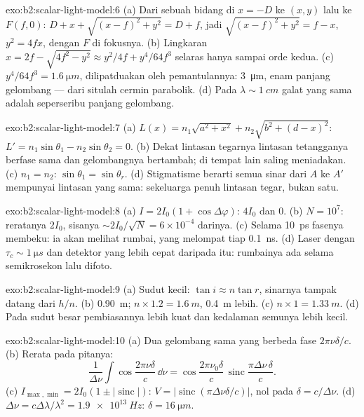 \begin{solution}{exo:b2:scalar-light-model:6}
(a) Dari sebuah  bidang di $x = -D$ ke $(x, y)$ lalu ke $F(f, 0)$: $D + x
+ \sqrt{(x - f)^2 + y^2} = D + f$, jadi $\sqrt{(x - f)^2 + y^2} = f - x$, $y^2 = 4fx$,
dengan $F$ di fokusnya. (b) Lingkaran $x = 2f - \sqrt{4f^2 - y^2} \approx y^2/4f +
y^4/64f^3$ selaras hanya sampai orde kedua. (c) $y^4/64f^3 = \qty{1.6}{\micro m}$, dilipatduakan
oleh pemantulannya: \qty{3}{\micro m}, enam panjang gelombang --- dari situlah cermin
parabolik. (d) Pada $\lambda \sim \qty{1}{cm}$ galat yang sama adalah seperseribu
panjang gelombang.
\end{solution}

\begin{solution}{exo:b2:scalar-light-model:7}
(a) $L(x) = n_1\sqrt{a^2 + x^2} + n_2\sqrt{b^2 + (d - x)^2}$: $L' = n_1\sin\theta_1 -
n_2\sin\theta_2 = 0$. (b) Dekat lintasan tegarnya lintasan tetangganya berfase
sama dan gelombangnya bertambah; di tempat lain saling meniadakan. (c) $n_1 = n_2$:
$\sin\theta_1 = \sin\theta_r$. (d) Stigmatisme berarti semua sinar dari $A$ ke $A'$ mempunyai
lintasan yang sama: sekeluarga penuh lintasan tegar, bukan satu.
\end{solution}

\begin{solution}{exo:b2:scalar-light-model:8}
(a) $I = 2I_0(1 + \cos\Delta\varphi)$: $4I_0$ dan $0$. (b) $N = 10^7$: reratanya $2I_0$, sisanya
$\sim 2I_0/\sqrt N = 6 \times 10^{-4}$ darinya. (c) Selama \qty{10}{ps} fasenya
membeku: ia akan melihat rumbai, yang melompat tiap \qty{0.1}{ns}. (d) Laser dengan
$\tau_c \sim \qty{1}{\micro s}$ dan detektor yang lebih cepat daripada itu: rumbainya ada
selama semikrosekon lalu difoto.
\end{solution}

\begin{solution}{exo:b2:scalar-light-model:9}
(a) Sudut kecil: $\tan i \approx n\tan r$, sinarnya tampak datang dari $h/n$.
(b) \qty{0.90}{m};  $n \times 1.2 = \qty{1.6}{m}$, \qty{0.4}{m} lebih.
(c) $n \times 1 = \qty{1.33}{m}$. (d) Pada sudut besar pembiasannya lebih kuat
dan kedalaman semunya lebih kecil.
\end{solution}

\begin{solution}{exo:b2:scalar-light-model:10}
(a) Dua gelombang sama yang berbeda fase $2\pi\nu\delta/c$. (b) Rerata
pada pitanya:
\[
\frac1{\Delta\nu}\int\cos\frac{2\pi\nu\delta}c\,\dd\nu = \cos\frac{2\pi\nu_0\delta}c\,\operatorname{sinc}\frac{\pi\Delta\nu\,\delta}c .
\]
(c)
$I_{\max, \min} = 2I_0(1 \pm |\operatorname{sinc}|)$: $V = |\operatorname{sinc}(\pi\Delta\nu\delta/c)|$,
nol pada $\delta = c/\Delta\nu$. (d) $\Delta\nu = c\Delta\lambda/\lambda^2 = \qty{1.9e13}{Hz}$: $\delta =
\qty{16}{\micro m}$.
\end{solution}

